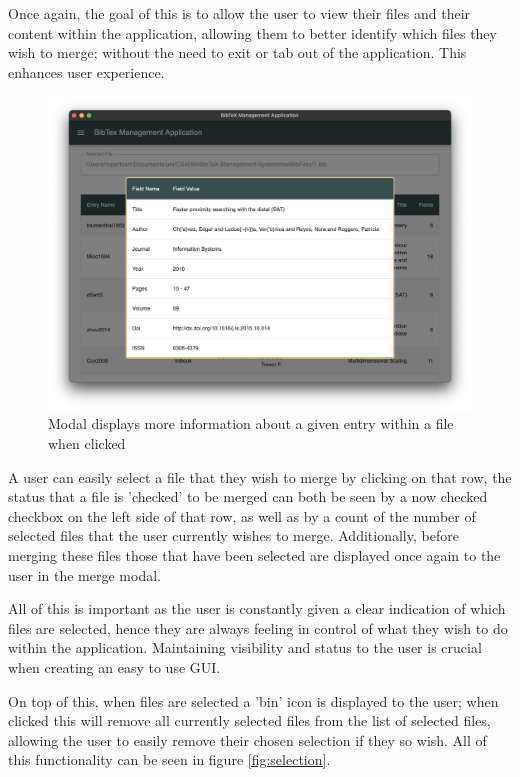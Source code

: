 \documentclass[a4paper,11pt]{article}
\begin{document}
Once again, the goal of this is to allow the user to view their files and their content within the application, allowing them to better identify which files they wish to merge; without the need to exit or tab out of the application. This enhances user experience.

\begin{figure}
    \centering
    \includegraphics[width=0.8\linewidth]{images/entryContents.png}
    \caption{Modal displays more information about a given entry within a file when clicked}
    \label{fig:entryContents}
\end{figure}

A user can easily select a file that they wish to merge by clicking on that row, the status that a file is 'checked' to be merged can both be seen by a now checked checkbox on the left side of that row, as well as by a count of the number of selected files that the user currently wishes to merge. Additionally, before merging these files those that have been selected are displayed once again to the user in the merge modal.

All of this is important as the user is constantly given a clear indication of which files are selected, hence they are always feeling in control of what they wish to do within the application. Maintaining visibility and status to the user is crucial when creating an easy to use GUI.

On top of this, when files are selected a 'bin' icon is displayed to the user; when clicked this will remove all currently selected files from the list of selected files, allowing the user to easily remove their chosen selection if they so wish. All of this functionality can be seen in figure \ref{fig:selection}.
\end{document}
